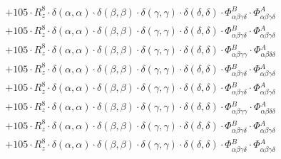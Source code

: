 \documentclass{article}
\begin{document}
\begin{subequations}
\begin{gather}
\begin{array}{c}
 \\[0.2em] 		 + 105 \cdot R_{z}^{8} \cdot \delta{}\left(\alpha{}, \alpha{}\right) \cdot \delta{}\left(\beta{}, \beta{}\right) \cdot \delta{}\left(\gamma{}, \gamma{}\right) \cdot \delta{}\left(\delta{}, \delta{}\right) \cdot \Phi{}^{B}_{\alpha{}\beta{}\gamma{}\delta{}} \cdot \Phi{}^{A}_{\alpha{}\beta{}\gamma{}\delta{}} 
 \\[0.2em] 		 + 105 \cdot R_{z}^{8} \cdot \delta{}\left(\alpha{}, \alpha{}\right) \cdot \delta{}\left(\beta{}, \beta{}\right) \cdot \delta{}\left(\gamma{}, \gamma{}\right) \cdot \delta{}\left(\delta{}, \delta{}\right) \cdot \Phi{}^{B}_{\alpha{}\beta{}\gamma{}\delta{}} \cdot \Phi{}^{A}_{\alpha{}\beta{}\gamma{}\delta{}} 
 \\[0.2em] 		 + 105 \cdot R_{z}^{8} \cdot \delta{}\left(\alpha{}, \alpha{}\right) \cdot \delta{}\left(\beta{}, \beta{}\right) \cdot \delta{}\left(\gamma{}, \gamma{}\right) \cdot \delta{}\left(\delta{}, \delta{}\right) \cdot \Phi{}^{B}_{\alpha{}\beta{}\gamma{}\gamma{}} \cdot \Phi{}^{A}_{\alpha{}\beta{}\delta{}\delta{}} 
 \\[0.2em] 		 + 105 \cdot R_{z}^{8} \cdot \delta{}\left(\alpha{}, \alpha{}\right) \cdot \delta{}\left(\beta{}, \beta{}\right) \cdot \delta{}\left(\gamma{}, \gamma{}\right) \cdot \delta{}\left(\delta{}, \delta{}\right) \cdot \Phi{}^{B}_{\alpha{}\beta{}\gamma{}\delta{}} \cdot \Phi{}^{A}_{\alpha{}\beta{}\gamma{}\delta{}} 
 \\[0.2em] 		 + 105 \cdot R_{z}^{8} \cdot \delta{}\left(\alpha{}, \alpha{}\right) \cdot \delta{}\left(\beta{}, \beta{}\right) \cdot \delta{}\left(\gamma{}, \gamma{}\right) \cdot \delta{}\left(\delta{}, \delta{}\right) \cdot \Phi{}^{B}_{\alpha{}\beta{}\gamma{}\delta{}} \cdot \Phi{}^{A}_{\alpha{}\beta{}\gamma{}\delta{}} 
 \\[0.2em] 		 + 105 \cdot R_{z}^{8} \cdot \delta{}\left(\alpha{}, \alpha{}\right) \cdot \delta{}\left(\beta{}, \beta{}\right) \cdot \delta{}\left(\gamma{}, \gamma{}\right) \cdot \delta{}\left(\delta{}, \delta{}\right) \cdot \Phi{}^{B}_{\alpha{}\beta{}\gamma{}\gamma{}} \cdot \Phi{}^{A}_{\alpha{}\beta{}\delta{}\delta{}} 
 \\[0.2em] 		 + 105 \cdot R_{z}^{8} \cdot \delta{}\left(\alpha{}, \alpha{}\right) \cdot \delta{}\left(\beta{}, \beta{}\right) \cdot \delta{}\left(\gamma{}, \gamma{}\right) \cdot \delta{}\left(\delta{}, \delta{}\right) \cdot \Phi{}^{B}_{\alpha{}\beta{}\gamma{}\delta{}} \cdot \Phi{}^{A}_{\alpha{}\beta{}\gamma{}\delta{}} 
 \\[0.2em] 		 + 105 \cdot R_{z}^{8} \cdot \delta{}\left(\alpha{}, \alpha{}\right) \cdot \delta{}\left(\beta{}, \beta{}\right) \cdot \delta{}\left(\gamma{}, \gamma{}\right) \cdot \delta{}\left(\delta{}, \delta{}\right) \cdot \Phi{}^{B}_{\alpha{}\beta{}\gamma{}\delta{}} \cdot \Phi{}^{A}_{\alpha{}\beta{}\gamma{}\delta{}} 

\end{array}
\end{gather}
\end{subequations}
\end{document}
